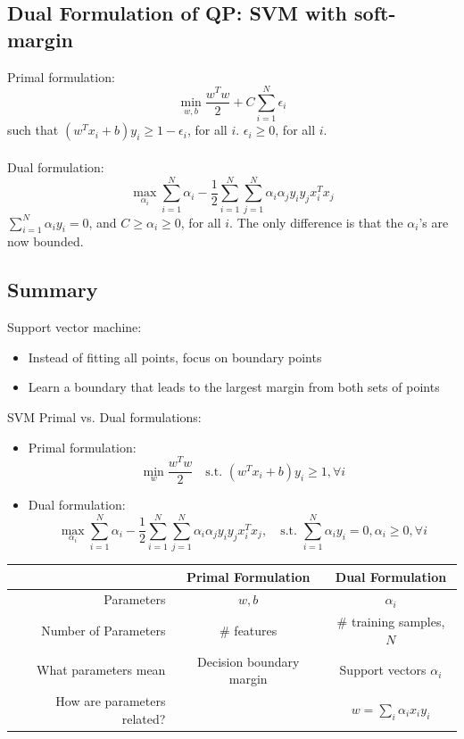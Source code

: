 \documentclass[10pt]{article}
\begin{document}
\subsection*{Dual Formulation of QP: SVM with soft-margin}
Primal formulation:
\[\min_{w, b} \frac{w^T w}{2} + C \sum_{i = 1}^N \epsilon_i\]
such that $(w^T x_i + b) y_i \geq 1 - \epsilon_i$, for all $i$.  $\epsilon_i \geq 0$, for all $i$.\\\\
Dual formulation:
\[\max_{\alpha_i} \sum_{i = 1}^N \alpha_i - \frac{1}{2} \sum_{i = 1}^N \sum_{j = 1}^N \alpha_i \alpha_j y_i y_j x_i^T x_j\]
$\sum_{i = 1}^N \alpha_i y_i = 0$, and $C \geq \alpha_i \geq 0$, for all $i$.  The only difference is that the $\alpha_i$'s are now bounded.

\subsection*{Summary}
Support vector machine:
\begin{itemize}
	\item Instead of fitting all points, focus on boundary points
	\item Learn a boundary that leads to the largest margin from both sets of points
\end{itemize}
SVM Primal vs. Dual formulations:
\begin{itemize}
	\item Primal formulation:
	\[\min_w \frac{w^T w}{2} \quad \text{s.t. } (w^T x_i + b) y_i \geq 1, \forall i\]
    \item Dual formulation:
    \[\max_{\alpha_i} \sum_{i = 1}^N \alpha_i - \frac{1}{2} \sum_{i = 1}^N \sum_{j = 1}^N \alpha_i \alpha_j y_i y_j x_i^T x_j,\quad \text{s.t. } \sum_{i = 1}^N \alpha_i y_i = 0, \alpha_i \geq 0, \forall i\]
\end{itemize}
\begin{center}
\begin{tabular}{r|c|c}
    & \textbf{Primal Formulation} & \textbf{Dual Formulation} \\ \hline
    Parameters & $w, b$ & $\alpha_i$ \\
    Number of Parameters & \# features & \# training samples, $N$ \\
    What parameters mean & Decision boundary margin & Support vectors $\alpha_i$ \\
    How are parameters related? & & $w = \sum_i \alpha_i x_i y_i$
\end{tabular}
\end{center}
\end{document}

